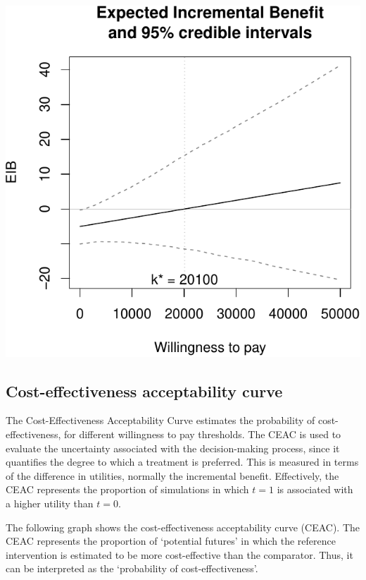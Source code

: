 \documentclass[]{article}
\begin{document}
\begin{center}\includegraphics{report_files/figure-latex/unnamed-chunk-4-1} \end{center}

\hypertarget{cost-effectiveness-acceptability-curve}{%
\subsection{Cost-effectiveness acceptability
curve}\label{cost-effectiveness-acceptability-curve}}

The Cost-Effectiveness Acceptability Curve estimates the probability of
cost-effectiveness, for different willingness to pay thresholds. The
CEAC is used to evaluate the uncertainty associated with the
decision-making process, since it quantifies the degree to which a
treatment is preferred. This is measured in terms of the difference in
utilities, normally the incremental benefit. Effectively, the CEAC
represents the proportion of simulations in which \(t=1\) is associated
with a higher utility than \(t=0\).

The following graph shows the cost-effectiveness acceptability curve
(CEAC). The CEAC represents the proportion of `potential futures' in
which the reference intervention is estimated to be more cost-effective
than the comparator. Thus, it can be interpreted as the `probability of
cost-effectiveness'.
\end{document}

